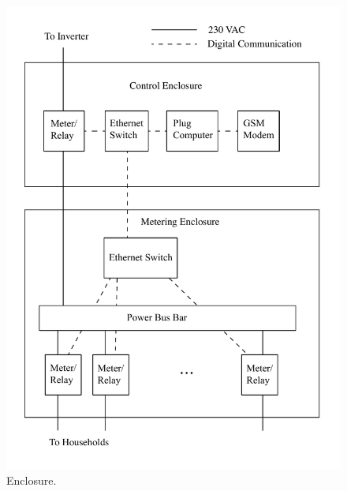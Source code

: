 \documentclass[conference]{IEEEtran}
\begin{document}
\begin{figure}[]
\begin{center}
\includegraphics[width=\columnwidth]{figures/Enclosure.pdf}
\end{center}
\caption{Enclosure.}
\label{Enclosure}
\end{figure}
\end{document}
